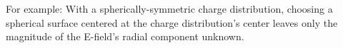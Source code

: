 \documentclass[10pt,letterpaper,twoside]{article}
\begin{document}
For example: With a spherically-symmetric charge distribution, choosing a spherical surface centered at the charge distribution's center leaves only the magnitude of the E-field's radial component unknown.



%
\end{document}
